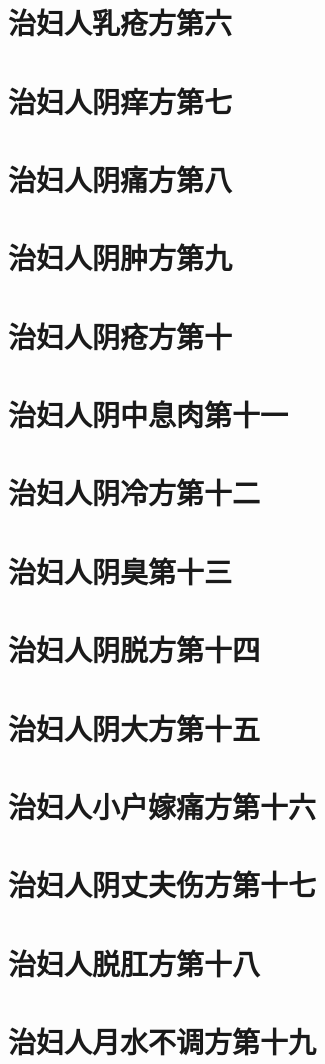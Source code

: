 \documentclass[a4paper,12pt,UTF8,twoside]{ctexbook}
\begin{document}
\chapter{治妇人乳疮方第六}
\chapter{治妇人阴痒方第七}
\chapter{治妇人阴痛方第八}
\chapter{治妇人阴肿方第九}
\chapter{治妇人阴疮方第十}
\chapter{治妇人阴中息肉第十一}
\chapter{治妇人阴冷方第十二}
\chapter{治妇人阴臭第十三}
\chapter{治妇人阴脱方第十四}
\chapter{治妇人阴大方第十五}
\chapter{治妇人小户嫁痛方第十六}
\chapter{治妇人阴丈夫伤方第十七}
\chapter{治妇人脱肛方第十八}
\chapter{治妇人月水不调方第十九}
\end{document}
